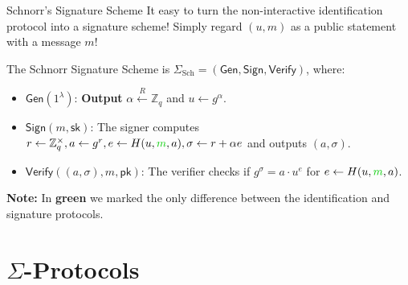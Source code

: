 \documentclass{zkdl-presentation-template}
\begin{document}
    \begin{frame}{Schnorr's Signature Scheme}
        It easy to turn the non-interactive identification protocol into a signature scheme! Simply regard $(u,m)$ as a public statement with a message $m$!

        \begin{definition}
            The Schnorr Signature Scheme is $\Sigma_{\text{Sch}} = (\mathsf{Gen}, \mathsf{Sign}, \mathsf{Verify})$, where:
            \begin{itemize}
                \item $\mathsf{Gen}(1^{\lambda})$: \textbf{Output} $\alpha \xleftarrow{R} \mathbb{Z}_q$ and $u \gets g^{\alpha}$.
                \item $\mathsf{Sign}(m,\mathsf{sk})$: The signer computes $r \gets \mathbb{Z}_q^{\times}, a \gets g^{r}, e \gets H(u, \textcolor{green!80!black}{m}, a), \sigma \gets r + \alpha e$ and outputs $(a,\sigma)$.
                \item $\mathsf{Verify}((a, \sigma), m,\mathsf{pk})$: The verifier checks if $g^{\sigma} = a \cdot u^e$ for $e \gets H(u, \textcolor{green!80!black}{m}, a)$.
            \end{itemize}
        \end{definition}

        \textbf{Note:} In \textcolor{green!80!black}{\textbf{green}} we marked the only difference between the identification and signature protocols.
    \end{frame}

    \section{$\Sigma$-Protocols}
    
\end{document}
